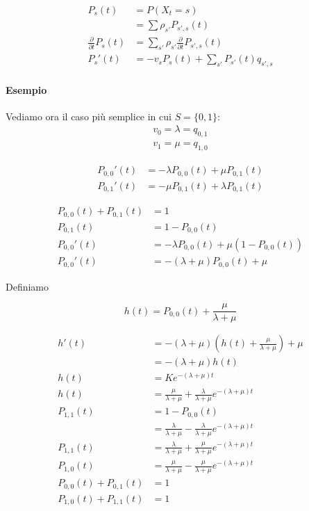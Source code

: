 \documentclass[a4paper,12pt]{book}
\begin{document}
\begin{align*}
	P_s(t) & = P(X_t = s) \\
	& = \sum \rho_{s'} P_{s',s}(t) \\
	\frac{\partial}{\partial t}P_s(t) & = \sum_{s'} \rho_{s'} \frac{\partial}{\partial t} P_{s',s}(t) \\
	P_s'(t) & = -v_s P_s(t) + \sum_{s'}P_{s'}(t) q_{s',s}
\end{align*}

\paragraph{Esempio }Vediamo ora il caso più semplice in cui $ S = \{0,1\} $:
$$ \begin{array}{c}
	v_0 = \lambda = q_{0,1} \\
	v_1 = \mu = q_{1,0}
\end{array} $$

\begin{align*}
	P_{0,0}'(t) & = -\lambda P_{0,0}(t) + \mu P_{0,1}(t) \\
	P_{0,1}'(t) & = -\mu P_{0,1}(t) + \lambda P_{0,1}(t)
\end{align*}

\begin{align*}
	P_{0,0}(t) + P_{0,1}(t) & = 1 \\
	P_{0,1}(t) & = 1 - P_{0,0}(t) \\
	P_{0,0}'(t) & = - \lambda P_{0,0}(t) + \mu(1 - P_{0,0}(t)) \\
	P_{0,0}'(t) & = -(\lambda + \mu)P_{0,0}(t) + \mu
\end{align*}

Definiamo 

$$ h(t) = P_{0,0}(t) + \frac{\mu}{\lambda + \mu} $$

\begin{align*}
	h'(t) & = -(\lambda + \mu)(h(t) + \frac{\mu}{\lambda + \mu}) + \mu \\
	& = -(\lambda + \mu) h(t) \\
	h(t) & = Ke^{-(\lambda + \mu)t} \\
	h(t) & = \frac{\mu}{\lambda + \mu} + \frac{\lambda}{\lambda + \mu}e^{-(\lambda + \mu)t} \\
	P_{1,1}(t) & = 1 - P_{0,0}(t) \\
	& = \frac{\lambda}{\lambda + \mu} - \frac{\lambda}{\lambda + \mu} e^{-(\lambda + \mu)t} \\
	P_{1,1}(t) & = \frac{\lambda}{\lambda + \mu} + \frac{\mu}{\lambda + \mu}e^{-(\lambda + \mu)t} \\
	P_{1,0}(t) & = \frac{\mu}{\lambda + \mu} - \frac{\mu}{\lambda + \mu}e^{-(\lambda + \mu)t} \\
	P_{0,0}(t) + P_{0,1}(t) & = 1 \\
	P_{1,0}(t) + P_{1,1}(t) & = 1
\end{align*}
\end{document}
